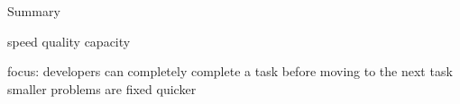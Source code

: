\documentclass[english]{tktltiki2}
\theoremstyle{definition}
\theoremstyle{remark}
\begin{document}
Summary

speed
quality
capacity

focus: developers can completely complete a task before moving to the next task
smaller problems are fixed quicker


%

















\end{document}
